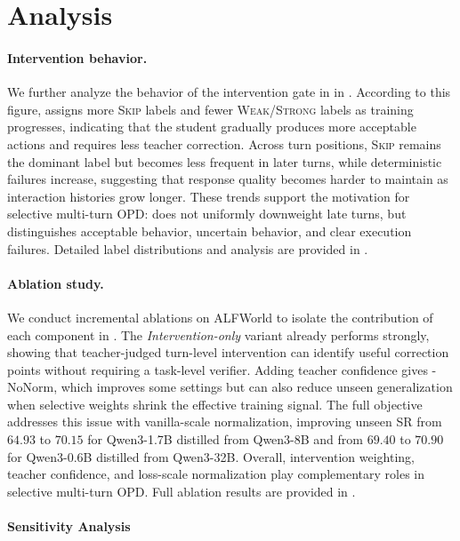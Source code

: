 \section{Analysis}
\label{sec:analysis}

\paragraph{Intervention behavior.}
We further analyze the behavior of the intervention gate in  in .
%
According to this figure, \ours{} assigns more \textsc{Skip} labels and fewer \textsc{Weak}/\textsc{Strong} labels as training progresses, indicating that the student gradually produces more acceptable actions and requires less teacher correction.
%
Across turn positions, \textsc{Skip} remains the dominant label but becomes less frequent in later turns, while deterministic failures increase, suggesting that response quality becomes harder to maintain as interaction histories grow longer.
%
These trends support the motivation for selective multi-turn OPD: \ours{} does not uniformly downweight late turns, but distinguishes acceptable behavior, uncertain behavior, and clear execution failures. Detailed label distributions and analysis are provided in .

\paragraph{Ablation study.}
We conduct incremental ablations on ALFWorld to isolate the contribution of each component in \ours{}.
%
The \textit{Intervention-only} variant already performs strongly, showing that teacher-judged turn-level intervention can identify useful correction points without requiring a task-level verifier.
%
Adding teacher confidence gives \ours{}-NoNorm, which improves some settings but can also reduce unseen generalization when selective weights shrink the effective training signal.
%
The full \ours{} objective addresses this issue with vanilla-scale normalization, improving unseen SR from $64.93$ to $70.15$ for Qwen3-1.7B distilled from Qwen3-8B and from $69.40$ to $70.90$ for Qwen3-0.6B distilled from Qwen3-32B.
%
Overall, intervention weighting, teacher confidence, and loss-scale normalization play complementary roles in selective multi-turn OPD.
%
Full ablation results are provided in .

\paragraph{Sensitivity Analysis}
\label{sec:sensitivity_analysis}

